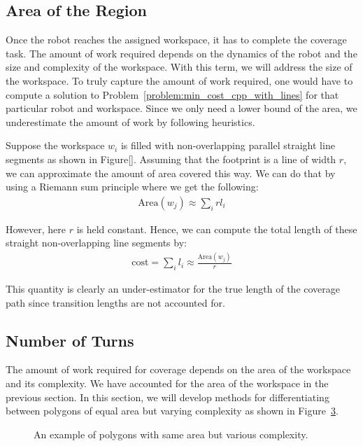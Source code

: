 \documentclass[../main.tex]{subfiles}
\begin{document}
\subsection{Area of the Region}

Once the robot reaches the assigned workspace, it has to complete the coverage task. The amount of work required depends on the dynamics of the robot and the size and complexity of the workspace. With this term, we will address the size of the workspace. To truly capture the amount of work required, one would have to compute a solution to Problem~\ref{problem:min_cost_cpp_with_lines} for that particular robot and workspace. Since we only need a lower bound of the area, we underestimate the amount of work by following heuristics. 

Suppose the workspace $w_i$ is filled with non-overlapping parallel straight line segments as shown in Figure[]. Assuming that the footprint is a line of width $r$, we can approximate the amount of area covered this way. We can do that by using a Riemann sum principle where we get the following:
\begin{equation}
\begin{aligned}
		\text{Area}(w_j)\approx\sum_{i}rl_i
\end{aligned}
\end{equation}

However, here $r$ is held constant. Hence, we can compute the total length of these straight non-overlapping line segments by:
\begin{equation}
\begin{aligned}
		\text{cost}=\sum_{i}l_i\approx\frac{\text{Area}(w_j)}{r}
\end{aligned}
\end{equation}

This quantity is clearly an under-estimator for the true length of the coverage path since transition lengths are not accounted for.


\subsection{Number of Turns}
The amount of work required for coverage depends on the area of the workspace and its complexity. We have accounted for the area of the workspace in the previous section. In this section, we will develop methods for differentiating between polygons of equal area but varying complexity as shown in Figure~\ref{fig:area_complexity}.

\begin{figure}
	\centering
	\begin{subfigure}{0.5\linewidth}
		\centering
		\caption{\label{fig:area_complexity_i}}
	\end{subfigure}%
	\begin{subfigure}{0.5\linewidth}
		\centering
		
		\caption{\label{fig:area_complexity_ii}}
	\end{subfigure}
	\caption{An example of polygons with same area but various complexity.}
	\label{fig:area_complexity}
\end{figure}
\end{document}
